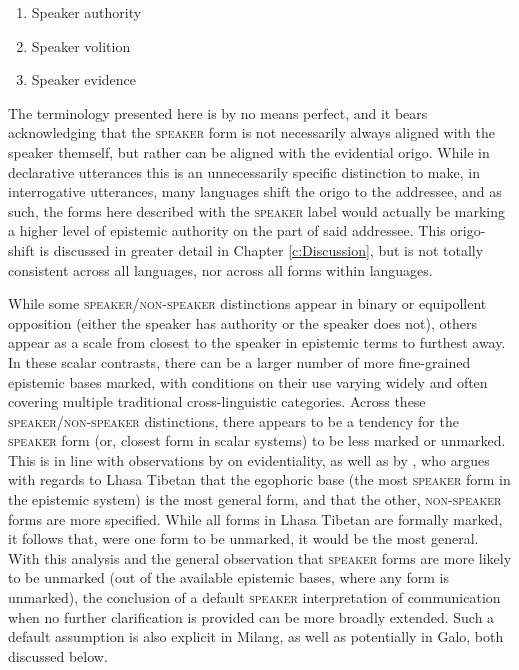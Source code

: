 \begin{enumerate}
        \item Speaker authority
        \item Speaker volition
        \item Speaker evidence
\end{enumerate} 

The terminology presented here is by no means perfect, and it bears acknowledging that the \textsc{speaker} form is not necessarily always aligned with the speaker themself, but rather can be aligned with the evidential origo. While in declarative utterances this is an unnecessarily specific distinction to make, in interrogative utterances, many languages shift the origo to the addressee, and as such, the forms here described with the \textsc{speaker} label would actually be marking a higher level of epistemic authority on the part of said addressee. This origo-shift is discussed in greater detail in Chapter \ref{c:Discussion}, but is not totally consistent across all languages, nor across all forms within languages. 

While some \textsc{speaker}/\textsc{non-speaker} distinctions appear in binary or equipollent opposition (either the speaker has authority or the speaker does not), others appear as a scale from closest to the speaker in epistemic terms to furthest away. In these scalar contrasts, there can be a larger number of more fine-grained epistemic bases marked, with conditions on their use varying widely and often covering multiple traditional cross-linguistic categories. Across these \textsc{speaker}/\textsc{non-speaker} distinctions, there appears to be a tendency for the \textsc{speaker} form (or, closest form in scalar systems) to be less marked or unmarked. This is in line with observations by  on evidentiality, as well as by , who argues with regards to Lhasa Tibetan that the egophoric base (the most \textsc{speaker} form in the epistemic system) is the most general form, and that the other, \textsc{non-speaker} forms are more specified. While all forms in Lhasa Tibetan are formally marked, it follows that, were one form to be unmarked, it would be the most general. With this analysis and the general observation that \textsc{speaker} forms are more likely to be unmarked (out of the available epistemic bases, where any form is unmarked), the conclusion of a default \textsc{speaker} interpretation of communication when no further clarification is provided can be more broadly extended. Such a default assumption is also explicit in Milang, as well as potentially in Galo, both discussed below.

